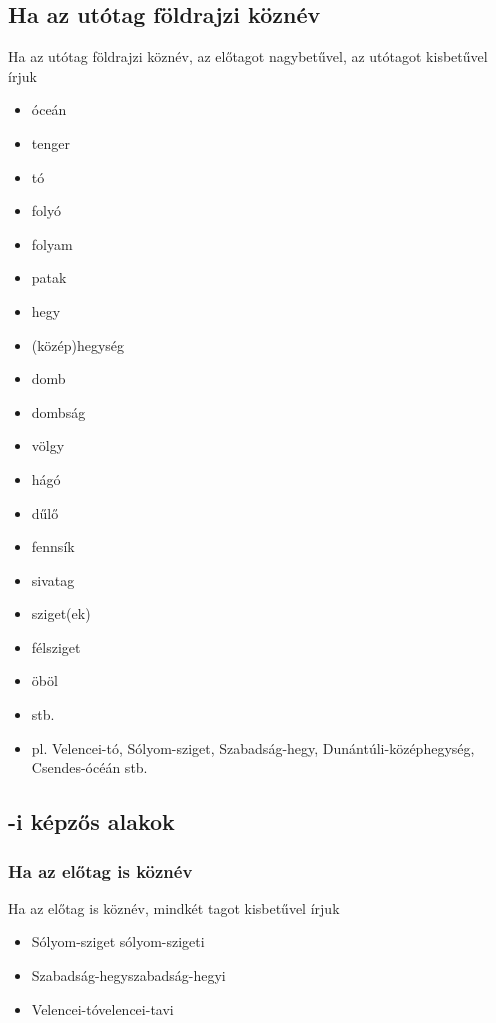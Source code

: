 \documentclass{article}
\begin{document}
\subsection{Ha az utótag földrajzi köznév}
Ha az utótag földrajzi köznév, az előtagot nagybetűvel, az utótagot kisbetűvel írjuk
\begin{itemize}
    \item óceán 
    \item tenger 
    \item tó 
    \item folyó
    \item folyam
    \item patak
    \item hegy
    \item (közép)hegység
    \item domb
    \item dombság
    \item völgy
    \item hágó
    \item dűlő
    \item fennsík
    \item sivatag
    \item sziget(ek)
    \item félsziget
    \item öböl
    \item stb.
    \item pl. Velencei-tó, Sólyom-sziget, Szabadság-hegy, Dunántúli-középhegység, Csendes-ócéán stb.
\end{itemize}

\subsection{-i képzős alakok}
\subsubsection{Ha az előtag is köznév}
Ha az előtag is köznév, mindkét tagot kisbetűvel írjuk
\begin{itemize}
    \item Sólyom-sziget \textrightarrow  sólyom-szigeti
    \item Szabadság-hegy\textrightarrow  szabadság-hegyi
    \item Velencei-tó\textrightarrow  velencei-tavi
\end{itemize}
\end{document}

